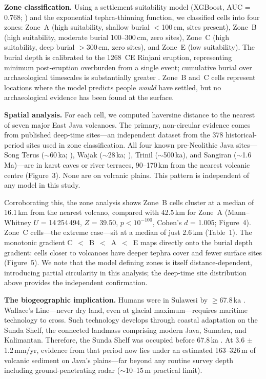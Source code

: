 \documentclass[12pt]{article}
\begin{document}
\textbf{Zone classification.}
Using a settlement suitability model (XGBoost, AUC = 0.768; \citealt{Amien2026b}) and the \citet{Pyle1989} exponential tephra-thinning function, we classified cells into four zones: Zone~A (high suitability, shallow burial $<$100\,cm, sites present), Zone~B (high suitability, moderate burial 100--300\,cm, zero sites), Zone~C (high suitability, deep burial $>$300\,cm, zero sites), and Zone~E (low suitability).
The burial depth is calibrated to the 1268~CE Rinjani eruption, representing minimum post-eruption overburden from a single event; cumulative burial over archaeological timescales is substantially greater \citep{Amien2026a}.
Zone~B and~C cells represent locations where the model predicts people \textit{would} have settled, but no archaeological evidence has been found at the surface.

\textbf{Spatial analysis.}
For each cell, we computed haversine distance to the nearest of seven major East Java volcanoes.
The primary, non-circular evidence comes from published deep-time sites---an independent dataset from the 378 historical-period sites used in zone classification. All four known pre-Neolithic Java sites---Song Terus ($\sim$60\,ka; \citealt{Semah2023}), Wajak ($\sim$28\,ka; \citealt{Storm2013}), Trinil ($\sim$500\,ka), and Sangiran ($\sim$1.6\,Ma)---are in karst caves or river terraces, 90--170\,km from the nearest volcanic centre (Figure~3).
None are on volcanic plains.
This pattern is independent of any model in this study.

Corroborating this, the zone analysis shows Zone~B cells cluster at a median of 16.1\,km from the nearest volcano, compared with 42.5\,km for Zone~A (Mann--Whitney $U$ = 14\,254\,494, $Z$ = 39.50, $p < 10^{-100}$, Cohen's $d$ = 1.005; Figure~4).
Zone~C cells---the extreme case---sit at a median of just 2.6\,km (Table~1).
The monotonic gradient C~$<$~B~$<$~A~$<$~E maps directly onto the burial depth gradient: cells closer to volcanoes have deeper tephra cover and fewer surface sites (Figure~5).
We note that the \citet{Pyle1989} model defining zones is itself distance-dependent, introducing partial circularity in this analysis; the deep-time site distribution above provides the independent confirmation.

\textbf{The biogeographic implication.}
Humans were in Sulawesi by $\geq$67.8\,ka \citep{Oktaviana2026}.
Wallace's Line---never dry land, even at glacial maximum---requires maritime technology to cross.
Such technology develops through coastal adaptation on the Sunda Shelf, the connected landmass comprising modern Java, Sumatra, and Kalimantan.
Therefore, the Sunda Shelf was occupied before 67.8\,ka \citep{Westaway2017}.
At 3.6 $\pm$ 1.2\,mm/yr, evidence from that period now lies under an estimated 163--326\,m of volcanic sediment on Java's plains---far beyond any routine survey depth including ground-penetrating radar ($\sim$10--15\,m practical limit).
\end{document}
